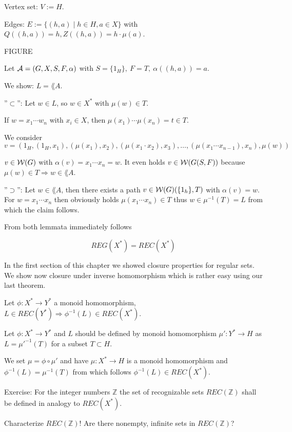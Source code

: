 Vertex set: $V := H$.

Edges: $E := \{ (h, a) \mid h \in H, a \in X \}$ with $Q((h,a)) = h, Z((h,a))
= h \cdot \mu(a)$.

FIGURE

Let $\mbox{$\mathcal{A}$} = (G, X, S, F, \alpha)$ with $S = \{ 1_H \},\ F = T,\ \alpha((h, a))
= a$.

We show: $L = \lang{A}$.

''$\subset$'': Let $w \in L$, so $w \in X^*$ with $\mu(w) \in T$.

If $w = x_1 \cdots w_n$ with $x_i \in X$, then $\mu(x_1) \cdots \mu(x_n) = t
\in T$.

We consider \[ v = (1_H, (1_H, x_1), (\mu(x_1), x_2), (\mu(x_1 \cdot x_2),
x_3), \ldots, (\mu(x_1 \cdots x_{n-1}), x_n), \mu(w)) \]

$v \in \mbox{$\mathcal{W}(G)$}$ with $\alpha(v) = x_1 \cdots x_n = w$. It even holds $v \in
\mbox{$\mathcal{W}(G(S, F))$}$ because $\mu(w) \in T \Rightarrow w \in \lang{A}$.

''$\supset$'': Let $w \in \lang{A}$, then there exists a path $v \in
\mbox{$\mathcal{W}(G)$}(\{1_h\}, T)$ with $\alpha(v) = w$. For $w = x_1 \cdots x_n$ then
obviously holds $\mu(x_1 \cdots x_n) \in T$ thus $w \in \mu^{-1}(T) = L$ from
which the claim follows.

From both lemmata immediately follows

\begin{theorem}
\[ REG(X^*) = REC(X^*) \]
\end{theorem}

In the first section of this chapter we showed closure properties for regular
sets. We show now closure under inverse homomorphism which is rather easy using
our last theorem.

\begin{theorem}
Let $\phi : X^* \to Y^*$ a monoid homomorphism, $L \in REC(Y^*) \Rightarrow
\phi^{-1}(L) \in REC(X^*)$.
\end{theorem}

Let $\phi : X^* \to Y^*$ and $L$ should be defined by monoid homomorphism $\mu'
: Y^* \to H$ as $L = \mu'^{-1}(T)$ for a subset $T \subset H$.

We set $\mu = \phi \circ \mu'$ and have $\mu : X^* \to H$ is a monoid
homomorphism and $\phi^{-1}(L) = \mu^{-1}(T)$ from which follows $\phi^{-1}(L)
\in REC(X^*)$.

Exercise: For the integer numbers $\mathbb{Z}$ the set of recognizable sets
$REC(\mathbb{Z})$ shall be defined in analogy to $REC(X^*)$.

Characterize $REC(\mathbb{Z})$! Are there nonempty, infinite sets in
$REC(\mathbb{Z})$?
